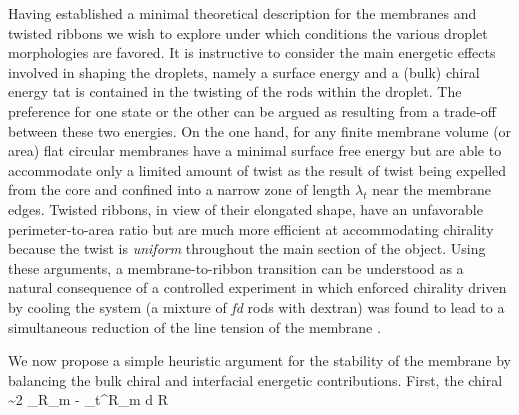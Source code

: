 Having established a minimal theoretical description for the membranes and twisted ribbons we wish to explore under which conditions the various droplet morphologies are favored. It is instructive to consider the main energetic effects involved in shaping the droplets, namely a surface energy and a (bulk) chiral energy tat is contained in the twisting of the rods within the droplet. The preference for one state or the other can be argued as resulting from a trade-off between these two energies. On the one hand, for any finite membrane volume (or area) flat circular membranes have a minimal surface free energy but are able to accommodate only a limited amount of twist as the result of twist being expelled from the core and confined into a narrow zone of length $\lambda_{t}$ near the membrane edges. Twisted ribbons, in view of their elongated shape, have an unfavorable perimeter-to-area ratio but are much more efficient at accommodating chirality because the twist is {\em uniform} throughout the main section of the object. Using these arguments, a membrane-to-ribbon transition can  be understood as a natural consequence of a controlled experiment in which enforced chirality driven by cooling the system (a mixture of {\em fd} rods with dextran) was found to lead to a simultaneous reduction of the line tension of the membrane \cite{Gibaud2012}.

We now propose a simple heuristic argument for the stability of the membrane  by balancing the bulk chiral and interfacial energetic contributions. First,  the chiral  
\beq
{} \sim 2 \pi \int_{R_{m} - \lambda_{t}}^{R_{m}} d R  
\eeq








